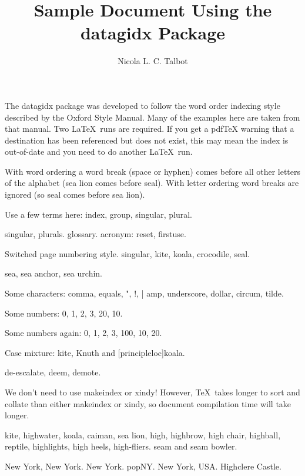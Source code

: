 \documentclass{article}
\title{Sample Document Using the datagidx Package}
\author{Nicola L. C. Talbot}
\begin{document}

The datagidx package was developed to follow the word order indexing
style described by the Oxford Style Manual. Many of the examples
here are taken from that manual. Two \LaTeX\ runs are required. If
you get a pdfTeX warning that a destination has been referenced but
does not exist, this may mean the index is out-of-date and you need
to do another \LaTeX\ run.

With word ordering a word break (space or hyphen) comes before all
other letters of the alphabet (\gls{sea lion} comes before \gls{seal}). 
With letter ordering word breaks are ignored (so \gls{seal} comes
before \gls{sea lion}).

Use a few terms here: \gls{index}, \gls{group}, \gls{singular}, \gls{plural}.

\newpage

\Gls{singular}, \glspl{plural}. \gls{glossary}.
\Gls{acronym}: \gls{reset}, \gls{firstuse}.

\newpage
{}

Switched page numbering style. \Gls{singular}, \gls{kite},
\gls{koala}, \gls{crocodile}, \gls{seal}.

\Gls{sea},
\gls{sea anchor},
\gls{sea urchin}.

Some characters: \gls{comma}, \gls{equals}, \gls{"}, \gls{!}, \gls{|}
\gls{amp}, \gls{underscore}, \gls{dollar}, \gls{circum},
\gls{tilde}.

Some numbers: \gls{0}, \gls{1}, \gls{2}, \gls{3}, \gls{20}, \gls{10}.

\newpage

Some numbers again: \gls{0}, \gls{1}, \gls{2}, \gls{3}, \gls{100},
\gls{10}, \gls{20}.

Case mixture: \gls{kite}, 
\gls{Knuth} and 
\gls{[principleloc]koala}.

\Gls{de-escalate}, \gls{deem}, \gls{demote}.

We don't need to use \gls{makeindex} or \gls{xindy}!
However, \TeX\ takes longer to sort and collate than either
\gls{makeindex} or \gls{xindy}, so document compilation time will
take longer.

\newpage

\Gls{kite}, \gls{highwater}, \gls{koala}, \gls{caiman}, \gls{sea
lion}, \gls{high},
\gls{highbrow}, \gls{high chair}, \gls{highball}, \gls{reptile},
\gls{highlights}, \gls{high heels}, \gls{high-fliers}.
\Gls{seam} and \gls{seam bowler}.

\gls{New York, New York}. \gls{New York}. 
\Gls{popNY}. \gls{New York, USA}.
\gls{Highclere Castle}.
\end{document}
